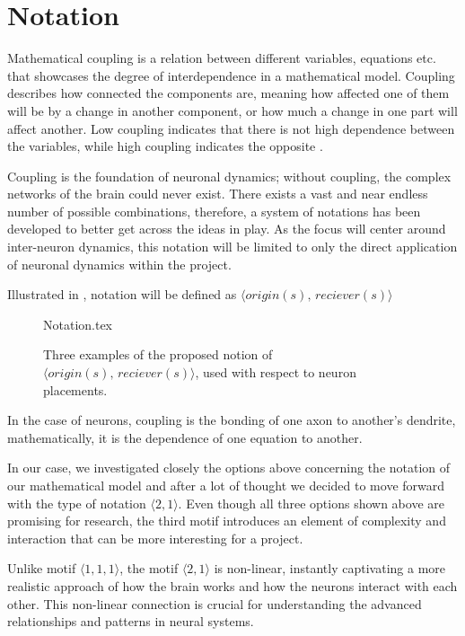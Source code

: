 \documentclass[class={myRUCProject}, crop=false]{standalone}
\begin{document}
\section{Notation}
Mathematical coupling is a relation between different variables, equations etc. that showcases the degree of interdependence in a mathematical model. Coupling describes how connected the components are, meaning how affected one of them will be by a change in another component, or how much a change in one part will affect another. Low coupling indicates that there is not high dependence between the variables, while high coupling indicates the opposite \cite{archie1981mathematic}. 

Coupling is the foundation of neuronal dynamics; without coupling, the complex networks of the brain could never exist. There exists a vast and near endless number of possible combinations, therefore, a system of notations has been developed to better get across the ideas in play. As the focus will center around inter-neuron dynamics, this notation will be limited to only the direct application of neuronal dynamics within the project.

Illustrated in , notation will be defined as \(\langle origin(s), \, reciever(s)\rangle\)
\begin{figure}[h]
    \centering
    {Notation.tex}
    \caption{Three examples of the proposed notion of \(\langle origin(s), \, reciever(s)\rangle\), used with respect to neuron placements.}\label{fig:notation}
\end{figure}

In the case of neurons, coupling is the bonding of one axon to another's dendrite, mathematically, it is the dependence of one equation to another.

In our case, we investigated closely the options above concerning the notation of our mathematical model and after a lot of thought we decided to move forward with the type of notation \(\langle 2,1\rangle\). Even though all three options shown above are promising for research, the third motif introduces an element of complexity and interaction that can be more interesting for a project. 

Unlike motif \(\langle 1,1,1\rangle\), the motif \(\langle 2,1\rangle\) is non-linear, instantly captivating a more realistic approach of how the brain works and how the neurons interact with each other. This non-linear connection is crucial for understanding the advanced relationships and patterns in neural systems. 
\end{document}
